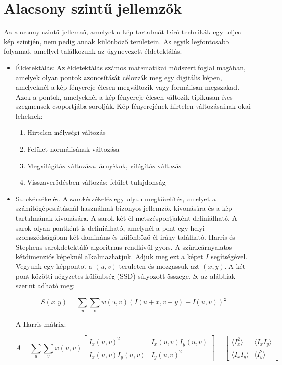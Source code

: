\section{Alacsony szintű jellemzők}
Az alacsony szintű jellemző\cite{features27:online}, amelyek a kép tartalmát leíró technikák egy teljes kép szintjén, nem pedig annak különböző területein. Az egyik legfontosabb folyamat, amellyel találkozunk az úgynevezett éldetektálás.
\begin{itemize}
\item Éldetektálás: Az éldetektálás számos matematikai módszert foglal magában, amelyek olyan pontok azonosítását célozzák meg egy digitális képen, amelyeknél a kép fényereje élesen megváltozik vagy formálisan megszakad. Azok a pontok, amelyeknél a kép fényereje élesen változik tipikusan íves szegmensek csoportjába sorolják.
Kép fényerejének hirtelen változásainak okai lehetnek:
\begin{enumerate}
\item Hirtelen mélységi változás
\item Felület normálisának változása
\item Megvilágítás változása: árnyékok, világítás változás
\item Visszaverődésben változás: felület tulajdonság
\end{enumerate}
\item Sarokérzékelés: A sarokérzékelés egy olyan megközelítés, amelyet a számítógépeslátásnál használnak bizonyos jellemzők kivonására és a kép tartalmának kivonására.
A sarok két él metszéspontjaként definiálható. A sarok olyan pontként is definiálható, amelynél a pont egy helyi szomszédságában két domináns és különböző él irány található.
Harris és Stephens sarokdetektáló algoritmus rendkivül gyors. A szürkeárnyalatos kétdimenziós képeknél alkalmazhatjuk. Adjuk meg ezt a képet $I$ segítségével. Vegyünk egy képpontot a $(u, v)$ területen és mozgassuk azt $(x, y)$. A két pont közötti négyzetes különbség (SSD) súlyozott összege, $S$, az alábbiak szerint adható meg:

$$
S(x,y)=\sum_{u}\sum_{v}w(u,v)(I(u+x,v+y)-I(u,v))^{2}
$$

A Harris mátrix:

$$
{\displaystyle A=\sum _{u}\sum _{v}w(u,v){\begin{bmatrix}I_{x}(u,v)^{2}&I_{x}(u,v)I_{y}(u,v)\\I_{x}(u,v)I_{y}(u,v)&I_{y}(u,v)^{2}\end{bmatrix}}={\begin{bmatrix}\langle I_{x}^{2}\rangle &\langle I_{x}I_{y}\rangle \\\langle I_{x}I_{y}\rangle &\langle I_{y}^{2}\rangle \end{bmatrix}}}
$$


\end{itemize}
